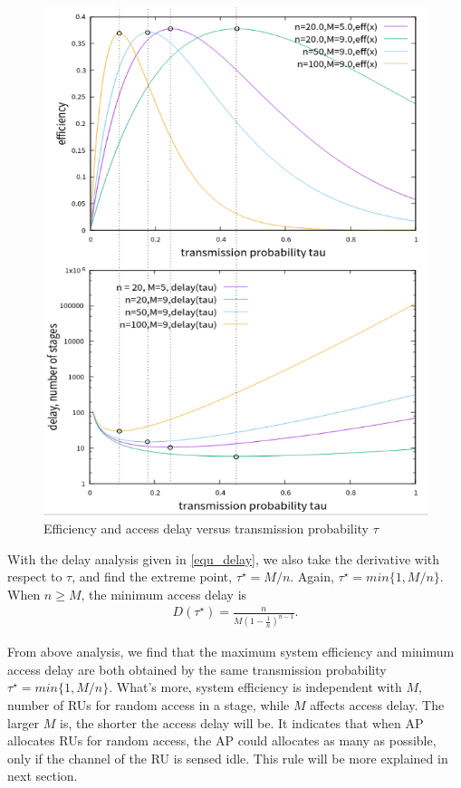 \begin{figure}[!ht]
\includegraphics[scale=0.64]{./figure/chp4/max_min.png}
\caption{Efficiency and access delay versus transmission probability $\tau$}
\label{fig_eff_def}
\end{figure}


With the delay analysis given in \ref{equ_delay}, we also take the derivative with respect to $\tau$, and find the extreme point, $\tau^\star = M/n$. Again, $\tau^\star = min\lbrace 1, M/n\rbrace$. 
When $n\geq M$, the minimum access delay is 
\begin{align}
\label{equ_min_delay}
D(\tau^\star) = \frac{n}{M(1-\frac{1}{n})^{n-1}}.
\end{align}

From above analysis, we find that the maximum system efficiency and minimum access delay are both obtained by the same transmission probability $\tau^\star = min\lbrace 1, M/n\rbrace$.
What's more, system efficiency is independent with $M$, number of RUs for random access in a stage, while $M$ affects access delay. 
The larger $M$ is, the shorter the access delay will be. 
It indicates that when AP allocates RUs for random access, the AP could allocates as many as possible, only if the channel of the RU is sensed idle. 
This rule will be more explained in next section.

